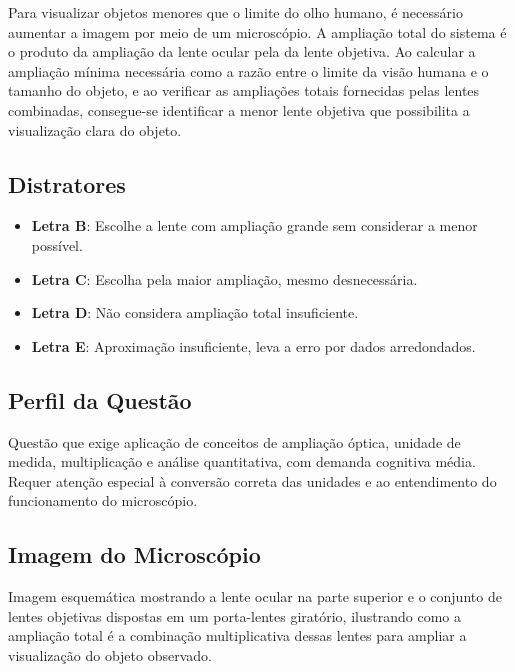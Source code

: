\documentclass{article}
\begin{document}
Para visualizar objetos menores que o limite do olho humano, é necessário aumentar a imagem por meio de um microscópio. A ampliação total do sistema é o produto da ampliação da lente ocular pela da lente objetiva. Ao calcular a ampliação mínima necessária como a razão entre o limite da visão humana e o tamanho do objeto, e ao verificar as ampliações totais fornecidas pelas lentes combinadas, consegue-se identificar a menor lente objetiva que possibilita a visualização clara do objeto.

\subsection*{Distratores}

\begin{itemize}
  \item \textbf{Letra B}: Escolhe a lente com ampliação grande sem considerar a menor possível.
  \item \textbf{Letra C}: Escolha pela maior ampliação, mesmo desnecessária.
  \item \textbf{Letra D}: Não considera ampliação total insuficiente.
  \item \textbf{Letra E}: Aproximação insuficiente, leva a erro por dados arredondados.
\end{itemize}

\subsection*{Perfil da Questão}

Questão que exige aplicação de conceitos de ampliação óptica, unidade de medida, multiplicação e análise quantitativa, com demanda cognitiva média. Requer atenção especial à conversão correta das unidades e ao entendimento do funcionamento do microscópio.

\subsection*{Imagem do Microscópio}

Imagem esquemática mostrando a lente ocular na parte superior e o conjunto de lentes objetivas dispostas em um porta-lentes giratório, ilustrando como a ampliação total é a combinação multiplicativa dessas lentes para ampliar a visualização do objeto observado.
\end{document}
